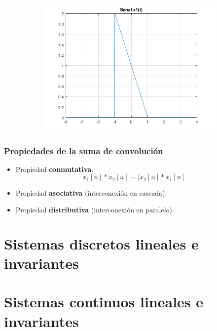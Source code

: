 \documentclass[a4paper]{book}
\begin{document}
\begin{myenumerate}
	\begin{figure}[!ht]
		\caption{}
		\label{fig:Problema_1_b}
		\centering
		\begin{subfigure}[b]{0.7\linewidth}
			\includegraphics[width=\linewidth]{./Imágenes/aau.png}
		\end{subfigure}
	\end{figure}

\end{myenumerate}


\setlength{\leftskip}{0pt}
\setlength{\rightskip}{0pt}


\subsubsection{Propiedades de la suma de convolución}
\vspace{\parskip}
\begin{itemize}
	\item Propiedad \textbf{conmutativa}. \[x_1[n]*x_2[n]=[x_2[n]*x_1[n] \]
	\item Propiedad \textbf{asociativa} (interconexión en cascada).
	\item Propiedad \textbf{distributiva} (interconexión en paralelo).
\end{itemize}

\section{Sistemas discretos lineales e invariantes}


\section{Sistemas continuos lineales e invariantes}
\end{document}
